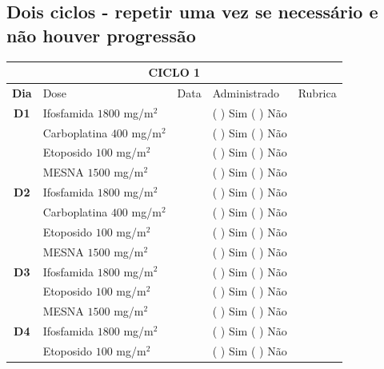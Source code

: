 \documentclass[11pt,a4paper,oldfontcommands]{memoir}
\begin{document}
\subsection{Dois ciclos - repetir uma vez se necessário e não houver progressão}

\begin{center}
\begin{table}[H]
\begin{tabular}{c|p{5cm}|p{1.4cm}|p{4cm}|p{2.8cm}}
	\hline
	\multicolumn{5}{c}{\textbf{CICLO 1}}\\
\hline
    \multicolumn{1}{c|}{\multirow{1}{*}{\textbf{Dia}}}&{Dose}&{Data}&{Administrado}&{Rubrica} \\
    \hline
    \multicolumn{1}{c|}{\multirow{1}{*}{\textbf{D1}}}&{Ifosfamida \(1800\) mg/m\(^2\)}&&{(  ) Sim (  ) Não}&\\
    \multicolumn{1}{c|}{\multirow{1}{*}{\textbf{}}}&{Carboplatina \(400\) mg/m\(^2\)}&&{(  ) Sim (  ) Não}&\\
    \multicolumn{1}{c|}{\multirow{1}{*}{\textbf{}}}&{Etoposido \(100\) mg/m\(^2\)}&&{(  ) Sim (  ) Não}&\\
    \multicolumn{1}{c|}{\multirow{1}{*}{\textbf{}}}&{MESNA \(1500\) mg/m\(^2\)}&&{(  ) Sim (  ) Não}&\\
    \multicolumn{1}{c|}{\multirow{1}{*}{\textbf{D2}}}&{Ifosfamida \(1800\) mg/m\(^2\)}&&{(  ) Sim (  ) Não}&\\
    \multicolumn{1}{c|}{\multirow{1}{*}{\textbf{}}}&{Carboplatina \(400\) mg/m\(^2\)}&&{(  ) Sim (  ) Não}&\\
    \multicolumn{1}{c|}{\multirow{1}{*}{\textbf{}}}&{Etoposido \(100\) mg/m\(^2\)}&&{(  ) Sim (  ) Não}&\\
    \multicolumn{1}{c|}{\multirow{1}{*}{\textbf{}}}&{MESNA \(1500\) mg/m\(^2\)}&&{(  ) Sim (  ) Não}&\\
    \multicolumn{1}{c|}{\multirow{1}{*}{\textbf{D3}}}&{Ifosfamida \(1800\) mg/m\(^2\)}&&{(  ) Sim (  ) Não}&\\
    \multicolumn{1}{c|}{\multirow{1}{*}{\textbf{}}}&{Etoposido \(100\) mg/m\(^2\)}&&{(  ) Sim (  ) Não}&\\
    \multicolumn{1}{c|}{\multirow{1}{*}{\textbf{}}}&{MESNA \(1500\) mg/m\(^2\)}&&{(  ) Sim (  ) Não}&\\
    \multicolumn{1}{c|}{\multirow{1}{*}{\textbf{D4}}}&{Ifosfamida \(1800\) mg/m\(^2\)}&&{(  ) Sim (  ) Não}&\\
    \multicolumn{1}{c|}{\multirow{1}{*}{\textbf{}}}&{Etoposido \(100\) mg/m\(^2\)}&&{(  ) Sim (  ) Não}&\\

\end{tabular}
\end{table}
\end{center}
\end{document}

